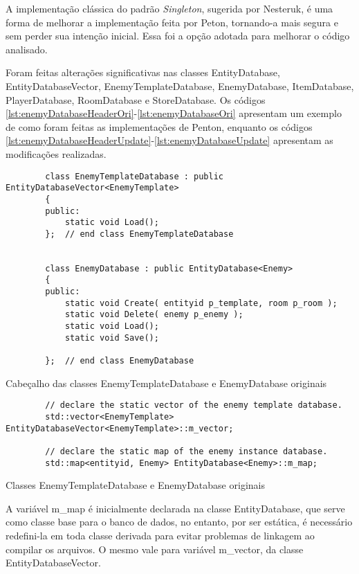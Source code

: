 A implementação clássica do padrão \textit{Singleton}, sugerida por Nesteruk, é uma forma
de melhorar a implementação feita por Peton, tornando-a mais segura e sem perder sua intenção inicial.
Essa foi a opção adotada para melhorar o código analisado.

Foram feitas alterações significativas nas classes EntityDatabase, EntityDatabaseVector, 
EnemyTemplateDatabase, EnemyDatabase, ItemDatabase, PlayerDatabase, RoomDatabase e StoreDatabase. 
Os códigos \ref{lst:enemyDatabaseHeaderOri}-\ref{lst:enemyDatabaseOri} apresentam um exemplo 
de como foram feitas as implementações de Penton, enquanto os códigos 
\ref{lst:enemyDatabaseHeaderUpdate}-\ref{lst:enemyDatabaseUpdate} apresentam as modificações realizadas.

\begin{listing}[!ht]
    \begin{verbatim}
        class EnemyTemplateDatabase : public EntityDatabaseVector<EnemyTemplate>
        {
        public:
            static void Load();
        };  // end class EnemyTemplateDatabase


        class EnemyDatabase : public EntityDatabase<Enemy>
        {
        public:
            static void Create( entityid p_template, room p_room );
            static void Delete( enemy p_enemy );
            static void Load();
            static void Save();

        };  // end class EnemyDatabase
    \end{verbatim}
\caption{Cabeçalho das classes EnemyTemplateDatabase e EnemyDatabase originais}
\label{lst:enemyDatabaseHeaderOri}
\end{listing}

\begin{listing}[!ht]
    \begin{verbatim}
        // declare the static vector of the enemy template database.
        std::vector<EnemyTemplate> EntityDatabaseVector<EnemyTemplate>::m_vector;

        // declare the static map of the enemy instance database.
        std::map<entityid, Enemy> EntityDatabase<Enemy>::m_map;
    \end{verbatim}
\caption{Classes EnemyTemplateDatabase e EnemyDatabase originais}
\label{lst:enemyDatabaseOri}
\end{listing}

A variável m\_map é inicialmente declarada na classe EntityDatabase, que serve como classe base para
o banco de dados, no entanto, por ser estática, é necessário redefini-la em toda classe derivada para 
evitar problemas de linkagem ao compilar os arquivos. O mesmo vale para variável m\_vector, da classe EntityDatabaseVector.

